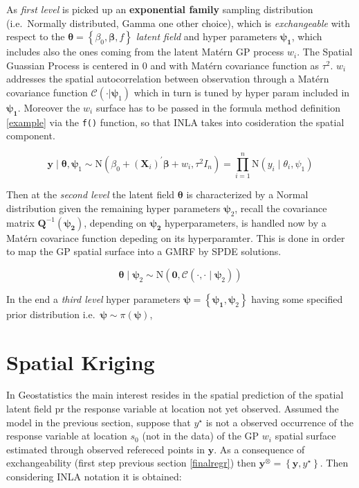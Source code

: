 \documentclass[
  12pt,
  a4paper,
  oneside]{book}
\newcommand{\passthrough}[1]{#1}
\theoremstyle{definition}
\theoremstyle{definition}
\theoremstyle{definition}
\theoremstyle{remark}
\begin{document}
As \emph{first level} is picked up an \textbf{exponential family} sampling distribution (i.e.~Normally distributed, Gamma one other choice), which is \emph{exchangeable} with respect to the \(\boldsymbol{\theta}=\left\{\beta_{0}, \boldsymbol{\beta}, f\right\}\) \emph{latent field} and hyper parameters \(\boldsymbol{\psi_{1}}\), which includes also the ones coming from the latent Matérn GP process \(w_{i}\). The Spatial Guassian Process is centered in 0 and with Matérn covariance function as \(\tau^2\). \(w_{i}\) addresses the spatial autocorrelation between observation through a Matérn covariance function \(\mathcal{C}(\cdot | \boldsymbol\psi_{1})\) which in turn is tuned by hyper param included in \(\boldsymbol{\psi_1}\). Moreover the \(w_{i}\) surface has to be passed in the formula method definition \ref{example} via the \passthrough{\lstinline!f()!} function, so that INLA takes into cosideration the spatial component.

\[
\boldsymbol{y} \mid \boldsymbol{\theta}, \boldsymbol{\psi}_{1} \sim \mathrm{N}\left(\beta_{0}+ (\mathbf{X}_{i})^{\prime}\boldsymbol{\beta} + w_{i} ,  \tau^2 I_{n}\right)=\prod_{i=1}^{n} \mathrm{N}\left(y_{i} \mid \theta_{i}, \psi_{1}\right)
\]

Then at the \emph{second level} the latent field \(\boldsymbol{\theta}\) is characterized by a Normal distribution given the remaining hyper parameters \(\boldsymbol{\psi}_2\), recall the covariance matrix \(\boldsymbol{Q}^{-1}(\boldsymbol{\psi_{2}})\), depending on \(\boldsymbol{\psi_{2}}\) hyperparameters, is handled now by a Matérn covariace function depeding on its hyperparamter. This is done in order to map the GP spatial surface into a GMRF by SPDE solutions.

\[
\boldsymbol{\theta} \mid \boldsymbol{\psi}_{2} \sim \mathrm{N}\left(\boldsymbol{0}, \mathcal{C}( \cdot , \cdot  \mid \boldsymbol{\psi}_{2})\right)
\]

In the end a \emph{third level} hyper parameters \(\boldsymbol{\psi}=\left\{\boldsymbol{\psi_{1}}, \boldsymbol{\psi}_{2}\right\}\) having some specified prior distribution i.e.~\(\boldsymbol{\psi} \sim \pi(\boldsymbol{\psi})\),

\hypertarget{spatial-kriging}{%
\section{Spatial Kriging}\label{spatial-kriging}}

In Geostatistics the main interest resides in the spatial prediction of the spatial latent field pr the response variable at location not yet observed.
Assumed the model in the previous section, suppose that \(y^{\star}\) is not a observed occurrence of the response variable at location \(s_{0}\) (not in the data) of the GP \(w_{i}\) spatial surface estimated through observed refereced points in \(\boldsymbol{y}\). As a consequence of exchangeability (first step previous section \ref{finalregr}) then \(\boldsymbol{y}^{\otimes}=\left\{\boldsymbol{y}, y^{\star}\right\}\). Then considering INLA notation it is obtained:
\end{document}
